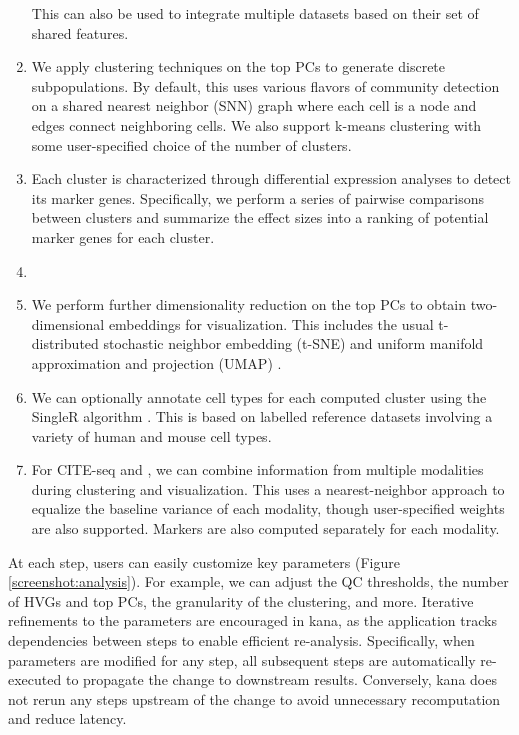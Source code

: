 \documentclass{article}
\begin{document}
\begin{enumerate}
This can also be used to integrate multiple datasets based on their set of shared features.
\item We apply clustering techniques on the top PCs to generate discrete subpopulations.
By default, this uses various flavors of community detection on a shared nearest neighbor (SNN) graph where each cell is a node and edges connect neighboring cells.
We also support k-means clustering with some user-specified choice of the number of clusters.
\item Each cluster is characterized through differential expression analyses to detect its marker genes.
Specifically, we perform a series of pairwise comparisons between clusters and summarize the effect sizes into a ranking of potential marker genes for each cluster.
\item {}
\item We perform further dimensionality reduction on the top PCs to obtain two-dimensional embeddings for visualization. 
This includes the usual t-distributed stochastic neighbor embedding (t-SNE) and uniform manifold approximation and projection (UMAP) \cite{maaten2014accelerating,mcinnes2018umap}.
\item We can optionally annotate cell types for each computed cluster using the SingleR algorithm \cite{aran2019reference}.
This is based on labelled reference datasets involving a variety of human and mouse cell types.
\item For CITE-seq \cite{stoeckius2017simultaneous} and , we can combine information from multiple modalities during clustering and visualization.
This uses a nearest-neighbor approach to equalize the baseline variance of each modality, though user-specified weights are also supported. 
Markers are also computed separately for each modality.
\end{enumerate}

At each step, users can easily customize key parameters (Figure \ref{screenshot:analysis}).
For example, we can adjust the QC thresholds, the number of HVGs and top PCs, the granularity of the clustering, and more. 
Iterative refinements to the parameters are encouraged in kana, as the application tracks dependencies between steps to enable efficient re-analysis.
Specifically, when parameters are modified for any step, all subsequent steps are automatically re-executed to propagate the change to downstream results.
Conversely, kana does not rerun any steps upstream of the change to avoid unnecessary recomputation and reduce latency.
\end{document}
